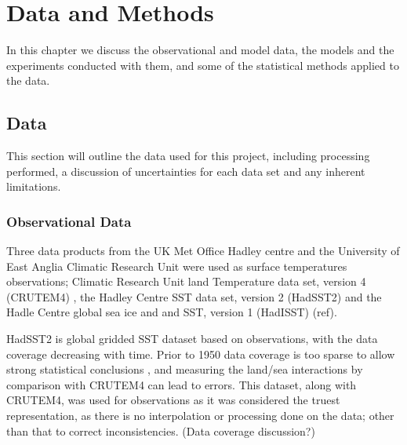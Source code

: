\chapter{Data and Methods} %

\label{methods} %


In this chapter we discuss the observational and model data, the models and the 
experiments conducted with them, and some of the statistical methods applied to 
the data.


\section{Data}

This section will outline the data used for this project, including processing 
performed, a discussion of uncertainties for each data set and any inherent 
limitations.

\subsection{Observational Data}

Three data products from the UK Met Office Hadley centre and the University of 
East Anglia Climatic Research Unit were used as surface temperatures 
observations; Climatic Research Unit land Temperature data set, version 
4 (CRUTEM4) \citep{Brohan2006}, the Hadley Centre SST data set,
version 2 (HadSST2) \citep{Rayner2006} and the Hadle Centre global sea ice and 
and SST, version 1 (HadISST) (ref).

HadSST2 is global gridded SST dataset based on observations, with the data 
coverage decreasing with time. Prior to 1950 data coverage is too sparse to 
allow strong statistical conclusions \citep{Dommenget2009}, and measuring the 
land/sea interactions by comparison with CRUTEM4 can lead to errors. This 
dataset, along with CRUTEM4, was used for observations as it was considered the 
truest representation, as there is no interpolation or processing done on the 
data; other than that to correct inconsistencies. (Data coverage discussion?)

